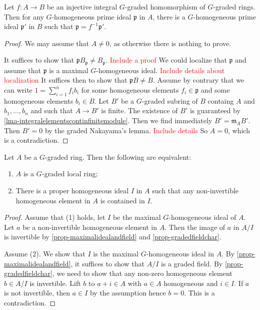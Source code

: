 \begin{proposition}\label{prop-integralextprimelift}
    Let $f:A\rightarrow B$ be an injective integral $G$-graded homomorphism of $G$-graded rings. Then for any $G$-homogeneous prime ideal $\mathfrak{p}$ in $A$, there is a $G$-homogeneous prime ideal $\mathfrak{p}'$ in $B$ such that $\mathfrak{p}=f^{-1}\mathfrak{p}'$.
\end{proposition}
\begin{proof}
    We may assume that $A\neq 0 $, as otherwise there is nothing to prove.

    It suffices to show that $\mathfrak{p}B_{\mathfrak{p}}\neq B_{\mathfrak{p}}$. \textcolor{red}{Include a proof}
    We could localize that $\mathfrak{p}$ and assume that $\mathfrak{p}$ is a maximal $G$-homogeneous ideal. \textcolor{red}{Include details about localization} It suffices then to show that $\mathfrak{p}B\neq B$. Assume by contrary that we can write $1=\sum_{i=1}^n f_i b_i$ for some homogeneous elements $f_i\in \mathfrak{p}$ and some homogeneous elements $b_i\in B$. Let $B'$ be a $G$-graded subring of $B$ containg $A$ and $b_1,\ldots,b_n$ and such that $A\rightarrow B'$ is finite. The existence of $B'$ is guaranteed by \cref{lma-integralelementscontinfinitemodule}. Then we find immediately $B'=\mathfrak{m}_AB'$. Then $B'=0$ by the graded Nakayama's lemma. \textcolor{red}{Include details} So $A=0$, which is a contradiction.
\end{proof}

\begin{lemma}
    Let $A$ be a $G$-graded ring. Then the following are equivalent:
    \begin{enumerate}
        \item $A$ is a $G$-graded local ring;
        \item There is a proper homogeneous ideal $I$ in $A$ such that any non-invertible homogeneous element in $A$ is contained in $I$.
    \end{enumerate}
\end{lemma}
\begin{proof}
    Assume that (1) holds, let $I$ be the maximal $G$-homogeneous ideal of $A$. Let $a$ be a non-invertible homogeneous element in $A$. Then the image of $a$ in $A/I$ is invertible by \cref{prop-maximalidealandfield} and \cref{prop-gradedfieldchar}.

    Assume (2). We show that $I$ is the maximal $G$-homogeneous ideal in $A$. By \cref{prop-maximalidealandfield}, it suffices to show that $A/I$ is a graded field. By \cref{prop-gradedfieldchar}, we need to show that any non-zero homogeneous element $b\in A/I$ is invertible. Lift $b$ to $a+i\in A$ with $a\in A$ homogeneous and $i\in I$. If $a$ is not invertible, then $a\in I$ by the assumption hence $b=0$. This is a contradiction.
\end{proof}


